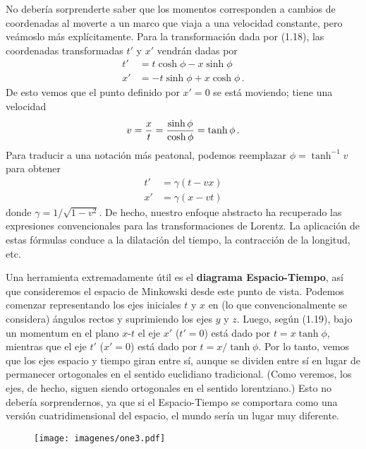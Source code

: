 \documentclass[11pt,b5paper,openany,twoside]{book}
\begin{document}
No debería sorprenderte saber que los momentos corresponden a cambios de coordenadas al moverte a un marco que viaja a una velocidad constante, pero veámoslo más explícitamente.
Para la transformación dada por (1.18), las coordenadas transformadas $t'$ y $x'$ vendrán dadas por
\begin{align}
t' &=  t\cosh\phi - x \sinh\phi \nonumber \\
x' &=  -t \sinh\phi + x\cosh\phi\,.\label{1.19}
\end{align}
De esto vemos que el punto definido por $x'=0$ se está moviendo; tiene una velocidad
\begin{equation}
v = {x\over t} = {{\sinh\phi}\over{\cosh\phi}} = \tanh\phi\,.
\label{1.20}
\end{equation}
Para traducir a una notación más peatonal, podemos reemplazar $\phi = \tanh^{-1}v$ para obtener
\begin{align}
t' &=  \gamma(t-vx)\nonumber \\
x' &=  \gamma(x-vt)\label{1.21}
\end{align}
donde $\gamma =1/\sqrt{1-v^2}$.
De hecho, nuestro enfoque abstracto ha recuperado las expresiones convencionales para las transformaciones de Lorentz.
La aplicación de estas fórmulas conduce a la dilatación del tiempo, la contracción de la longitud, etc.

Una herramienta extremadamente útil es el {\bf diagrama Espacio-Tiempo}, así que consideremos el espacio de Minkowski desde este punto de vista.
Podemos comenzar representando los ejes iniciales $t$ y $x$ en (lo que convencionalmente se considera) ángulos rectos y suprimiendo los ejes $y$ y $z$.
Luego, según (1.19), bajo un momentum en el plano $x$-$t$ el eje $x'$ ($t' = 0$) está dado por $t = x \tanh\phi$, mientras que el eje $t'$ ($x' = 0$) está dado por $t = x/\tanh\phi$.
Por lo tanto, vemos que los ejes espacio y tiempo giran entre sí, aunque se dividen entre sí en lugar de permanecer ortogonales en el sentido euclidiano tradicional.
(Como veremos, los ejes, de hecho, siguen siendo ortogonales en el sentido lorentziano.)
Esto no debería sorprendernos, ya que si el Espacio-Tiempo se comportara como una versión cuatridimensional del espacio, el mundo sería un lugar muy diferente.

\begin{figure}[h]
\centering
\texttt{[image: imagenes/one3.pdf]}
\end{figure}
\end{document}
